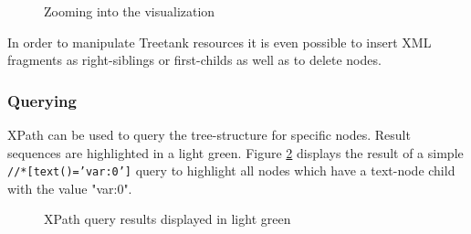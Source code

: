 \begin{itemize}
\begin{figure}[tb]
\caption{\label{fig:zoom} Zooming into the visualization}
\end{figure}

In order to manipulate Treetank resources it is even possible to insert XML fragments as right-siblings or first-childs as well as to delete nodes.

\subsubsection{Querying}
XPath can be used to query the tree-structure for specific nodes. Result sequences are highlighted in a light green. Figure \ref{fig:sunburstxpath} displays the result of a simple \texttt{//*[text()='var:0']} query to highlight all nodes which have a text-node child with the value "var:0".

\begin{figure}[tb]
\caption{\label{fig:sunburstxpath} XPath query results displayed in light green}
\end{figure}


\end{itemize}
